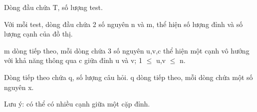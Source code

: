 Dòng đầu chứa T, số lượng test.  

   Với mỗi test, dòng đầu chứa 2 số nguyên n và m, thể hiện số lượng đỉnh và số lượng cạnh của đồ thị.  

   m dòng tiếp theo, mỗi dòng chứa 3 số nguyên u,v,c thể hiện một cạnh vô hướng với khả năng thông qua c giữa đỉnh u và v; 1  $\le$  u,v  $\le$  n.  

   Dòng tiếp theo chứa q, số lượng câu hỏi. q dòng tiếp theo, mỗi dòng chứa một số nguyên x.  

   Lưu ý: có thể có nhiều cạnh giữa một cặp đỉnh.